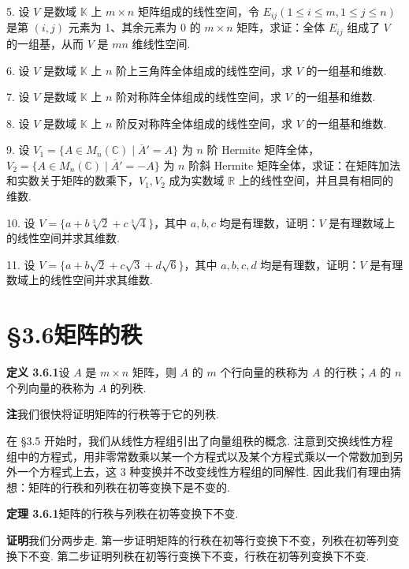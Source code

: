 \documentclass[UTF8, 12pt, fontset=fandol, oneside]{ctexart}
\begin{document}
5. 设 $V$ 是数域 $\mathbb{K}$ 上 $m\times n$ 矩阵组成的线性空间，令 $E_{ij}(1\leq i\leq m,1\leq j\leq n)$ 是第 $(i,j)$ 元素为 1、其余元素为 0 的 $m\times n$ 矩阵，求证：全体 $E_{ij}$ 组成了 $V$ 的一组基，从而 $V$ 是 $mn$ 维线性空间.

6. 设 $V$ 是数域 $\mathbb{K}$ 上 $n$ 阶上三角阵全体组成的线性空间，求 $V$ 的一组基和维数.

7. 设 $V$ 是数域 $\mathbb{K}$ 上 $n$ 阶对称阵全体组成的线性空间，求 $V$ 的一组基和维数.

8. 设 $V$ 是数域 $\mathbb{K}$ 上 $n$ 阶反对称阵全体组成的线性空间，求 $V$ 的一组基和维数.

9. 设 $V_1=\{A\in M_n(\mathbb{C})\mid \overline{A}'=A\}$ 为 $n$ 阶 Hermite 矩阵全体，$V_2=\{A\in M_n(\mathbb{C})\mid \overline{A}'=-A\}$ 为 $n$ 阶斜 Hermite 矩阵全体，求证：在矩阵加法和实数关于矩阵的数乘下，$V_1,V_2$ 成为实数域 $\mathbb{R}$ 上的线性空间，并且具有相同的维数.

10. 设 $V=\{a+b\sqrt[3]{2}+c\sqrt[3]{4}\}$，其中 $a,b,c$ 均是有理数，证明：$V$ 是有理数域上的线性空间并求其维数.

11. 设 $V=\{a+b\sqrt{2}+c\sqrt{3}+d\sqrt{6}\}$，其中 $a,b,c,d$ 均是有理数，证明：$V$ 是有理数域上的线性空间并求其维数.

\section*{§3.6\quad 矩阵的秩}

\noindent\textbf{定义 3.6.1}\quad 设 $A$ 是 $m\times n$ 矩阵，则 $A$ 的 $m$ 个行向量的秩称为 $A$ 的行秩；$A$ 的 $n$ 个列向量的秩称为 $A$ 的列秩.

\noindent\textbf{注}\quad 我们很快将证明矩阵的行秩等于它的列秩.

在 §3.5 开始时，我们从线性方程组引出了向量组秩的概念. 注意到交换线性方程组中的方程式，用非零常数乘以某一个方程式以及某个方程式乘以一个常数加到另外一个方程式上去，这 3 种变换并不改变线性方程组的同解性. 因此我们有理由猜想：矩阵的行秩和列秩在初等变换下是不变的.

\noindent\textbf{定理 3.6.1}\quad 矩阵的行秩与列秩在初等变换下不变.

\noindent\textbf{证明}\quad 我们分两步走. 第一步证明矩阵的行秩在初等行变换下不变，列秩在初等列变换下不变. 第二步证明列秩在初等行变换下不变，行秩在初等列变换下不变.
\end{document}
